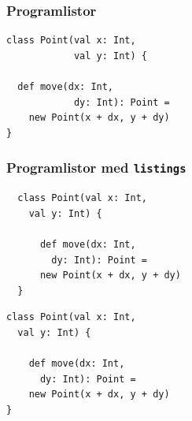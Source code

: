 \begin{frame}[fragile,t]
  \frametitle{Programlistor}
  \vspace{.5em}

  \begin{itemize}
  \end{itemize}

  \halfblankline
  \begin{exsrc}
\usepackage{fancyvrb}

\end{exsrc}
\begin{exresult}%
{\small
\begin{verbatim}
class Point(val x: Int, 
            val y: Int) {
  
  def move(dx: Int, 
            dy: Int): Point = 
    new Point(x + dx, y + dy)
}
\end{verbatim}
}  
  \end{exresult}
\end{frame}

\begin{frame}[fragile,t]
  \frametitle{Programlistor med \texttt{listings}}
  \vspace{.5em}

  \begin{itemize}
  \end{itemize}

  \begin{exsrc}
\lstset{
  language=Scala,
  basicstyle=\ttfamily\small,
}

\begin{lstlisting}
  class Point(val x: Int, 
    val y: Int) {

      def move(dx: Int, 
        dy: Int): Point = 
      new Point(x + dx, y + dy)
  }
\end{lstlisting}
  \end{exsrc}
  \begin{exresult}
\begin{lstlisting}[style=scalaex]
class Point(val x: Int, 
  val y: Int) {

    def move(dx: Int, 
      dy: Int): Point = 
    new Point(x + dx, y + dy)
}
  \end{lstlisting}
  \end{exresult}
\end{frame}


